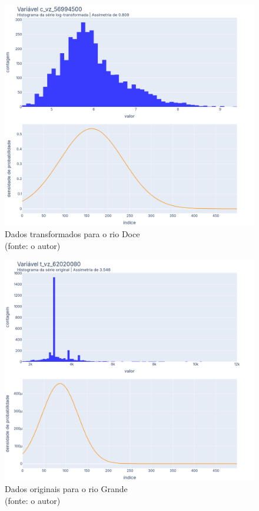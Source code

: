 \begin{figure}[!h]
	\centering
	\includegraphics[scale=0.8]{Figuras/rio_doce/rio_doce_depois_log.png}
	\caption{Dados transformados para o rio Doce\\(fonte: o autor)}
	\label{fig:rio_doce_depois_log}
\end{figure}

\begin{figure}[!h]
	\centering
	\includegraphics[scale=0.8]{Figuras/rio_grande/rio_grande_antes_log.png}
	\caption{Dados originais para o rio Grande\\(fonte: o autor)}
	\label{fig:rio_grande_antes_log}
\end{figure}

